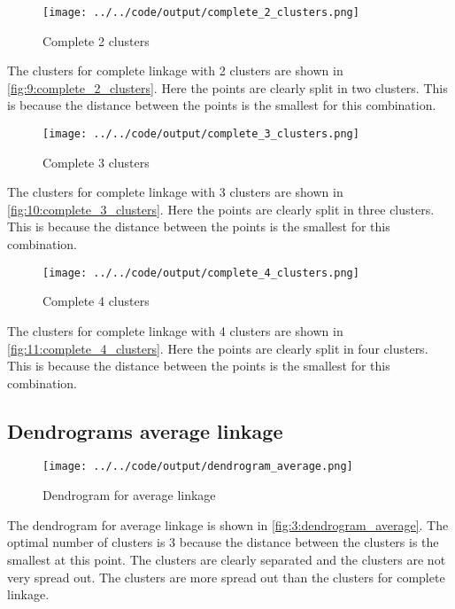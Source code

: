 \documentclass[twoside, a4paper, fleqn, reqno]{article}
\begin{document}
\begin{figure}[H]
	\centering
	\texttt{[image: ../../code/output/complete\_2\_clusters.png]}
	\caption{Complete 2 clusters}
	\label{fig:9:complete_2_clusters}
\end{figure}

The clusters for complete linkage with 2 clusters are shown in \autoref{fig:9:complete_2_clusters}.
Here the points are clearly split in two clusters.
This is because the distance between the points is the smallest for this combination.

\begin{figure}[H]
	\centering
	\texttt{[image: ../../code/output/complete\_3\_clusters.png]}
	\caption{Complete 3 clusters}
	\label{fig:10:complete_3_clusters}
\end{figure}

The clusters for complete linkage with 3 clusters are shown in \autoref{fig:10:complete_3_clusters}.
Here the points are clearly split in three clusters.
This is because the distance between the points is the smallest for this combination.

\begin{figure}[H]
	\centering
	\texttt{[image: ../../code/output/complete\_4\_clusters.png]}
	\caption{Complete 4 clusters}
	\label{fig:11:complete_4_clusters}
\end{figure}

The clusters for complete linkage with 4 clusters are shown in \autoref{fig:11:complete_4_clusters}.
Here the points are clearly split in four clusters.
This is because the distance between the points is the smallest for this combination.

\subsection{Dendrograms average linkage}

\begin{figure}[H]
	\centering
	\texttt{[image: ../../code/output/dendrogram\_average.png]}
	\caption{Dendrogram for average linkage}
	\label{fig:3:dendrogram_average}
\end{figure}

The dendrogram for average linkage is shown in \autoref{fig:3:dendrogram_average}.
The optimal number of clusters is 3 because the distance between the clusters is the smallest at this point.
The clusters are clearly separated and the clusters are not very spread out.
The clusters are more spread out than the clusters for complete linkage.
\end{document}
